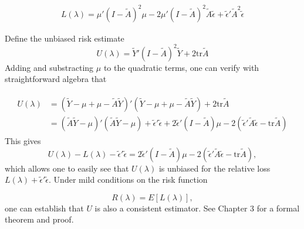 \documentclass[12pt]{article}
\newcommand{\tildeY}{\tilde{Y}}
\newcommand{\tildeA}{\tilde{A}}
\newcommand{\tildeepsilon}{\tilde{\epsilon}}
\theoremstyle{definition}
\begin{document}
\begin{align} 
L\left(\lambda\right) = \mu'\left( I - \tildeA \right)^2\mu - 2\mu'\left( I - \tildeA \right)^2 \tildeA \tildeepsilon + \tildeepsilon' \tildeA^2 \tildeepsilon
\end{align}

Define the unbiased risk estimate
\begin{equation} 
U\left(\lambda\right) = \tildeY'\left( I - \tildeA \right)^2\tildeY + 2\mbox{tr}\tildeA
\end{equation}
 \noindent
Adding and substracting $\mu$ to the quadratic terms, one can verify with straightforward algebra that

\begin{align}
\begin{split}
U\left(\lambda\right) &= \left( \tildeY - \mu + \mu - \tildeA \tildeY \right)'\left( \tildeY - \mu + \mu - \tildeA \tildeY \right) + 2\mbox{tr}\tildeA \\
&= \left(\tildeA \tildeY - \mu \right)'\left( \tildeA \tildeY - \mu \right) + \tildeepsilon'\tildeepsilon + 2\tildeepsilon' \left( I- \tildeA\right)\mu- 2\left( \tildeepsilon'\tildeA \tildeepsilon -  \mbox{tr}\tildeA\right)
\end{split}
\end{align}
\noindent
This gives
\begin{equation} 
U\left(\lambda\right) - L\left(\lambda\right) - \tildeepsilon'\tildeepsilon  =  2\tildeepsilon' \left( I- \tildeA\right)\mu- 2\left( \tildeepsilon'\tildeA \tildeepsilon -  \mbox{tr}\tildeA\right), 
\end{equation}
 \noindent
 which allows one to easily see that $U\left(\lambda\right)$ is unbiased for the relative loss $L\left(\lambda\right) + \tildeepsilon'\tildeepsilon$.  Under mild conditions on the risk function
 
 \[
 R\left(\lambda\right) = E\left[L\left(\lambda\right)\right],
 \]
\noindent
one can establish that $U$ is also a consistent estimator. See \citet{gu2013smoothing} Chapter 3 for a formal theorem and proof.
\end{document}
